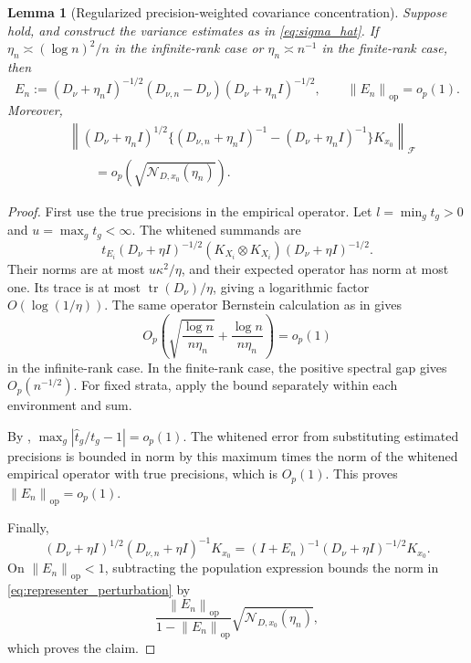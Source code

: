 \documentclass[11pt]{article}
\newtheorem{lemma}{Lemma}[section]
\newcommand{\F}{\mathcal{F}}
\newcommand{\Ncal}{\mathcal{N}}
\newcommand{\op}{\mathrm{op}}
\newcommand{\norm}[1]{\left\lVert #1\right\rVert}
\begin{document}
\begin{lemma}[Regularized precision-weighted covariance concentration]\label{lem:precision_concentration}
Suppose  hold, and construct the variance estimates as in \eqref{eq:sigma_hat}. If $\eta_n\asymp(\log n)^2/n$ in the infinite-rank case or $\eta_n\asymp n^{-1}$ in the finite-rank case, then
\[
 E_n:=(D_\nu+\eta_n I)^{-1/2}(D_{\nu,n}-D_\nu)(D_\nu+\eta_n I)^{-1/2},
 \qquad \norm{E_n}_{\op}=o_p(1).
\]
Moreover,
\begin{align}
 &\norm{(D_\nu+\eta_n I)^{1/2}
 \{(D_{\nu,n}+\eta_n I)^{-1}-(D_\nu+\eta_n I)^{-1}\}K_{x_0}}_{\F}\nonumber\\
 &\qquad=o_p\!\left(\sqrt{\Ncal_{D,x_0}(\eta_n)}\right).
 \label{eq:representer_perturbation}
\end{align}
\end{lemma}
\begin{proof}
First use the true precisions in the empirical operator. Let $l=\min_gt_g>0$ and $u=\max_gt_g<\infty$. The whitened summands are
\[
 t_{E_i}(D_\nu+\eta I)^{-1/2}(K_{X_i}\otimes K_{X_i})(D_\nu+\eta I)^{-1/2}.
\]
Their norms are at most $u\kappa^2/\eta$, and their expected operator has norm at most one. Its trace is at most $\operatorname{tr}(D_\nu)/\eta$, giving a logarithmic factor $O(\log(1/\eta))$. The same operator Bernstein calculation as in  gives
\[
 O_p\!\left(\sqrt{\frac{\log n}{n\eta_n}}+
 \frac{\log n}{n\eta_n}\right)=o_p(1)
\]
in the infinite-rank case. In the finite-rank case, the positive spectral gap gives $O_p(n^{-1/2})$. For fixed strata, apply the bound separately within each environment and sum.

By , $\max_g|\widehat t_g/t_g-1|=o_p(1)$. The whitened error from substituting estimated precisions is bounded in norm by this maximum times the norm of the whitened empirical operator with true precisions, which is $O_p(1)$. This proves $\norm{E_n}_{\op}=o_p(1)$.

Finally,
\[
 (D_\nu+\eta I)^{1/2}(D_{\nu,n}+\eta I)^{-1}K_{x_0}
 =(I+E_n)^{-1}(D_\nu+\eta I)^{-1/2}K_{x_0}.
\]
On $\norm{E_n}_{\op}<1$, subtracting the population expression bounds the norm in \eqref{eq:representer_perturbation} by
\[
 \frac{\norm{E_n}_{\op}}{1-\norm{E_n}_{\op}}
 \sqrt{\Ncal_{D,x_0}(\eta_n)},
\]
which proves the claim.
\end{proof}
\end{document}
